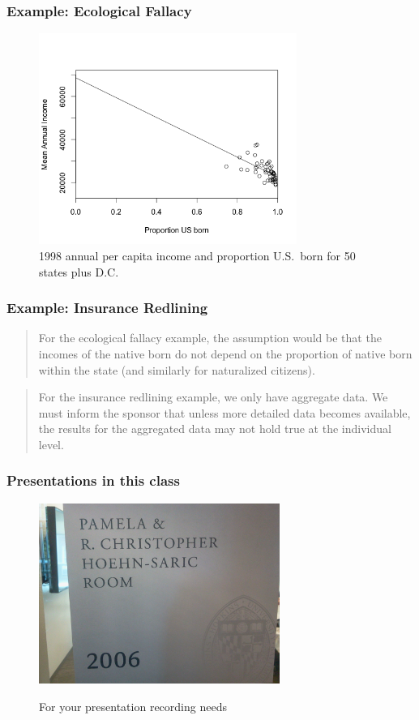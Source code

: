 \documentclass[hyperref={colorlinks=false},compress,handout,10pt]{beamer}
\begin{document}
\begin{frame}
    \frametitle{Example: Ecological Fallacy}
    \begin{figure}
        \centering
        \caption{1998 annual per capita income and proportion U.S.~born for 50
        states plus D.C.}
        \includegraphics[width=0.75\textwidth]{images/FigureFarawayFigure11dot1b.png}
    \end{figure}
\end{frame}

\begin{frame}[fragile]
    \frametitle{Example: Insurance Redlining}
    \begin{verse}
For the ecological fallacy example, 
the assumption would be that the incomes of 
the native born do not depend on the proportion of native 
born within the state (and similarly for naturalized citizens).
    \end{verse}
    \vskip0.5in
    \begin{verse}
        For the insurance redlining example, we only have aggregate data.  
        We must inform the sponsor that unless more detailed data becomes
        available, the results for the aggregated data may not hold true 
        at the individual level. 
    \end{verse}
\end{frame}

\begin{frame}
    \frametitle{Presentations in this class}
    \begin{figure}
        \caption{For your presentation recording needs}
        \href{https://know.it.jhu.edu/display/TECHCLASS/Homewood+Campus}{
        \includegraphics[width=0.7\textwidth]{images/BLC2006.jpg}}
    \end{figure}
\end{frame}
            
\end{document}

